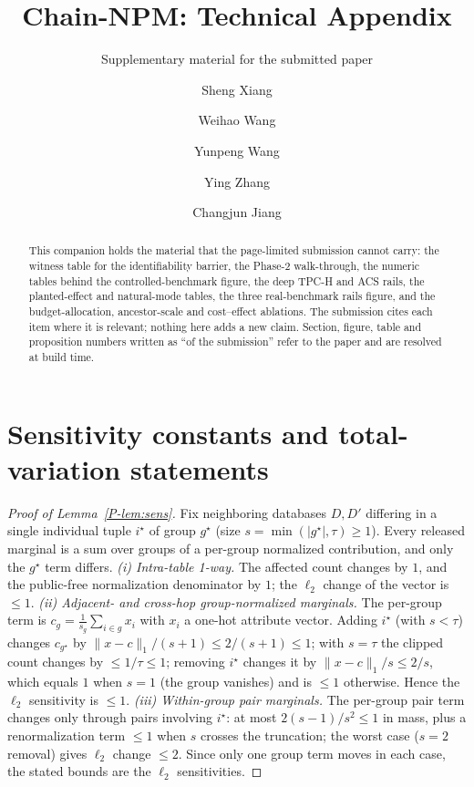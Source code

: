 \documentclass[sigconf, nonacm]{acmart}
\title{Chain-NPM: Technical Appendix}
\subtitle{Supplementary material for the submitted paper}
\author{Sheng Xiang}
\affiliation{%
  \institution{Tongji University}
}
\author{Weihao Wang}
\affiliation{%
  \institution{Tongji University}
}
\author{Yunpeng Wang}
\affiliation{%
  \institution{Tongji University}
}
\author{Ying Zhang}
\affiliation{%
  \institution{Zhejiang Gongshang University}
}
\author{Changjun Jiang}
\affiliation{%
  \institution{Tongji University}
}
\newcommand{\pref}[1]{\ref{P-#1}}
\begin{document}
\begin{abstract}
This companion holds the material that the page-limited submission cannot
carry: the witness table for the identifiability barrier, the Phase-2
walk-through, the numeric tables behind the controlled-benchmark figure, the
deep TPC-H and ACS rails, the planted-effect and natural-mode tables, the
three real-benchmark rails figure, and the budget-allocation, ancestor-scale
and cost--effect ablations.  The submission cites each item where it is
relevant; nothing here adds a new claim.  Section, figure, table and
proposition numbers written as ``of the submission'' refer to the paper and
are resolved at build time.
\end{abstract}

\maketitle

\section{Sensitivity constants and total-variation statements}
\label{app:proofs}

\begin{proof}[Proof of Lemma~\pref{lem:sens}]
Fix neighboring databases $D,D'$ differing in a single individual tuple
$i^\star$ of group $g^\star$ (size $s=\min(|g^\star|,\tau)\ge1$). Every
released marginal is a sum over groups of a per-group normalized
contribution, and only the $g^\star$ term differs.
\emph{(i) Intra-table 1-way.} The affected count changes by $1$, and the
public-free normalization denominator by $1$; the $\ell_2$ change of the
vector is $\le1$.
\emph{(ii) Adjacent- and cross-hop group-normalized marginals.} The
per-group term is $c_g=\frac{1}{s_g}\sum_{i\in g}x_i$ with $x_i$ a one-hot
attribute vector. Adding $i^\star$ (with $s<\tau$) changes $c_{g^\star}$ by
$\|x-c\|_1/(s+1)\le2/(s+1)\le1$; with $s=\tau$ the clipped count changes by
$\le1/\tau\le1$; removing $i^\star$ changes it by $\|x-c\|_1/s\le2/s$, which
equals $1$ when $s=1$ (the group vanishes) and is $\le1$ otherwise. Hence
the $\ell_2$ sensitivity is $\le1$.
\emph{(iii) Within-group pair marginals.} The per-group pair term changes
only through pairs involving $i^\star$: at most $2(s-1)/s^2\le1$ in mass,
plus a renormalization term $\le1$ when $s$ crosses the truncation; the
worst case ($s=2$ removal) gives $\ell_2$ change $\le2$.
Since only one group term moves in each case, the stated bounds are the
$\ell_2$ sensitivities.
\end{proof}
\end{document}
